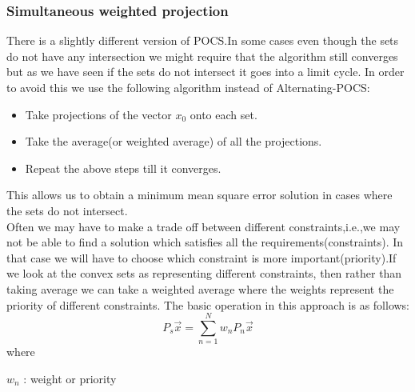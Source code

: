 \documentclass{article}
\begin{document}
\subsubsection{Simultaneous weighted projection}
There is a slightly different version of POCS.In some cases even though the sets do not have any intersection we might require that the algorithm still converges but as we have seen if the sets do not intersect it goes into a limit cycle. In order to avoid this we use the following algorithm instead of Alternating-POCS:
\begin{itemize}
    \item Take projections of the vector $x_0$ onto each set.
    \item Take the average(or weighted average) of all the projections.
    \item Repeat the above steps till it converges.
\end{itemize}
This allows us to obtain a minimum mean square error solution in cases where the sets do not intersect.\\
Often we may have to make a trade off between different constraints,i.e.,we may not be able to find a solution which satisfies all the requirements(constraints). In that case we will have to choose which constraint is more important(priority).If we look at the convex sets as representing different constraints, then rather than taking average we can take a weighted average where the weights represent the priority of different constraints. The basic operation in this approach is as follows:
\begin{equation}
    P_s\overrightarrow{x} = \sum_{n=1}^{N}w_nP_n\overrightarrow{x}
\end{equation}
where
\begin{center}
    $w_n$ : weight or priority
\end{center}
\end{document}
